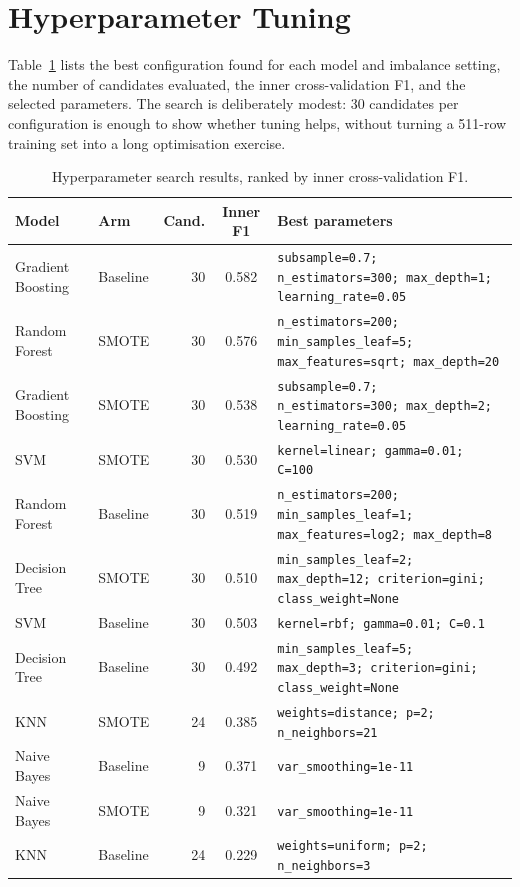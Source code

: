 \section{Hyperparameter Tuning}
\label{sec:tuning}

Table~\ref{tab:tuning-results} lists the best configuration found for each model and imbalance setting, the number of candidates evaluated, the inner cross-validation F1, and the selected parameters. The search is deliberately modest: 30 candidates per configuration is enough to show whether tuning helps, without turning a 511-row training set into a long optimisation exercise.

\begin{table}[H]
    \centering
    \caption{Hyperparameter search results, ranked by inner cross-validation F1.}
    \label{tab:tuning-results}
    \small
    \begin{tabularx}{\textwidth}{@{}l l r c X@{}}
        \toprule
        \textbf{Model} & \textbf{Arm} & \textbf{Cand.} & \textbf{Inner F1} & \textbf{Best parameters} \\
        \midrule
        Gradient Boosting & Baseline & 30 & 0.582 & \texttt{subsample=0.7; n\_estimators=300; max\_depth=1; learning\_rate=0.05} \\
        Random Forest & SMOTE & 30 & 0.576 & \texttt{n\_estimators=200; min\_samples\_leaf=5; max\_features=sqrt; max\_depth=20} \\
        Gradient Boosting & SMOTE & 30 & 0.538 & \texttt{subsample=0.7; n\_estimators=300; max\_depth=2; learning\_rate=0.05} \\
        SVM & SMOTE & 30 & 0.530 & \texttt{kernel=linear; gamma=0.01; C=100} \\
        Random Forest & Baseline & 30 & 0.519 & \texttt{n\_estimators=200; min\_samples\_leaf=1; max\_features=log2; max\_depth=8} \\
        Decision Tree & SMOTE & 30 & 0.510 & \texttt{min\_samples\_leaf=2; max\_depth=12; criterion=gini; class\_weight=None} \\
        SVM & Baseline & 30 & 0.503 & \texttt{kernel=rbf; gamma=0.01; C=0.1} \\
        Decision Tree & Baseline & 30 & 0.492 & \texttt{min\_samples\_leaf=5; max\_depth=3; criterion=gini; class\_weight=None} \\
        KNN & SMOTE & 24 & 0.385 & \texttt{weights=distance; p=2; n\_neighbors=21} \\
        Naive Bayes & Baseline & 9 & 0.371 & \texttt{var\_smoothing=1e-11} \\
        Naive Bayes & SMOTE & 9 & 0.321 & \texttt{var\_smoothing=1e-11} \\
        KNN & Baseline & 24 & 0.229 & \texttt{weights=uniform; p=2; n\_neighbors=3} \\
        \bottomrule
    \end{tabularx}
\end{table}

